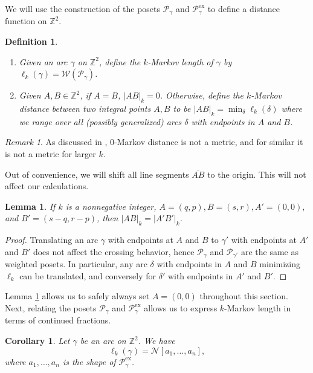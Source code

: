 \documentclass[12pt, letterpaper,table]{amsart}
\newtheorem{definition}[theorem]{Definition}
\newtheorem{lemma}[theorem]{Lemma}
\newtheorem{cor}[theorem]{Corollary}
\theoremstyle{remark}
\newtheorem{remark}[theorem]{Remark}
\newcommand{\calP}{\mathcal{P}}
\newcommand{\exx}{\mathrm{ex}}
\begin{document}
We will use the construction of the posets $\calP_\gamma$ and $\calP^\exx_\gamma$ to define a distance function on $\mathbb{Z}^2$.

\begin{definition}\label{def:kMarkovLength}
\begin{enumerate}
    \item  Given an arc $\gamma$ on $\mathbb{Z}^2$, define the \emph{$k$-Markov length} of $\gamma$ by $\ell_k(\gamma) = \mathcal{W}(\calP_\gamma)$.
    \item Given $A,B \in \mathbb{Z}^2$, if $A = B$,  $\vert AB \vert_k = 0$. Otherwise, define the \emph{$k$-Markov distance} between two integral points $A,B$ to be $\vert AB\vert_k =  \min_{\delta} \ell_k(\delta)$ where we range over all (possibly generalized) arcs $\delta$ with endpoints in $A$ and $B$.
\end{enumerate}
\end{definition}

\begin{remark}
As discussed in \cite[Remark 3.7]{LLRS}, $0$-Markov distance is not a metric, and for similar it is not a metric for larger $k$.
\end{remark}

Out of convenience, we will shift all line segments $\overline{AB}$ to the origin. This will not affect our calculations.

\begin{lemma}\label{lem:Translate}
If $k$ is a nonnegative integer, $A = (q,p), B = (s,r), A' = (0,0),$ and $B' = (s-q, r-p)$, then $\vert AB \vert_k = \vert A'B'\vert_k$.
\end{lemma}

\begin{proof}
Translating  an arc $\gamma$ with endpoints at $A$ and $B$ to  $\gamma'$ with endpoints at $A'$ and $B'$ does not affect the crossing behavior, hence $\calP_{\gamma}$ and $\calP_{\gamma'}$ are the same as weighted posets. In particular, any arc $\delta$ with endpoints in $A$ and $B$ minimizing $\ell_k$ can be translated, and conversely for $\delta'$ with endpoints in $A'$ and $B'$. 
\end{proof}

 Lemma \ref{lem:Translate} allows us to safely always set $A = (0,0)$ throughout this section. Next, relating the posets $\calP_\gamma$ and $\calP^\exx_\gamma$ allows us to express $k$-Markov length in terms of continued fractions. 

\begin{cor}\label{cor:CountLength}
Let $\gamma$ be an arc on $\mathbb{Z}^2$. We have
\[
\ell_k(\gamma)  = \mathcal{N}[a_1,\ldots,a_n],
\]
where $a_1,\ldots,a_n$ is the shape of $\calP^\exx_\gamma$.
\end{cor}
\end{document}
